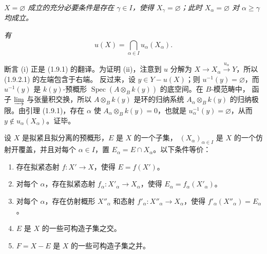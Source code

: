 \begin{env}[1.9.2.i]
\label{IV.1.9.2.i-fr}
\emph{$X=\varnothing$ 成立的充分必要条件是存在 $\gamma\in I$，使得
$X_\gamma=\varnothing$；此时 $X_\alpha=\varnothing$ 对
$\alpha\geq\gamma$ 均成立。}
\end{env}


\begin{env}[1.9.2.ii]
\label{IV.1.9.2.ii-fr}
\emph{有}
\[
  u(X)=\bigcap_{\alpha\in I}u_\alpha(X_\alpha). \tag{1.9.2.1}
  \label{IV.1.9.2.1-fr}
\]
\end{env}

断言 (i) 正是 (1.9.1) 的翻译。为证明 (ii)，注意到 $u$ 分解为
$X\to X_\alpha\xrightarrow{u_\alpha}Y$，所以 (1.9.2.1) 的左端包含于右端。
反过来，设 $y\in Y-u(X)$；则 $u^{-1}(y)=\varnothing$，而 $u^{-1}(y)$ 是
$k(y)$-预概形 $\operatorname{Spec}(A\otimes_Bk(y))$ 的底空间。在 $B$-模范畴中，
函子 $\varinjlim$ 与张量积交换，所以 $A\otimes_Bk(y)$ 是环的归纳系统
$A_\alpha\otimes_Bk(y)$ 的归纳极限。由引理 (1.9.1)，存在 $\alpha$ 使
$A_\alpha\otimes_Bk(y)=0$，也就是 $u_\alpha^{-1}(y)=\varnothing$，从而
$y\notin u_\alpha(X_\alpha)$。证毕。

\begin{proposition}[1.9.3]
\label{IV.1.9.3-fr}
设 $X$ 是拟紧且拟分离的预概形，$E$ 是 $X$ 的一个子集，
$(X_\alpha)_{\alpha\in I}$ 是 $X$ 的一个仿射开覆盖，并且对每个
$\alpha\in I$，置 $E_\alpha=E\cap X_\alpha$。以下条件等价：
\begin{enumerate}
  \item[a)] 存在拟紧态射 $f:X'\to X$，使得 $E=f(X')$。
  \item[a$'$)] 对每个 $\alpha$，存在拟紧态射
  $f_\alpha:X'_\alpha\to X_\alpha$，使得
  $E_\alpha=f_\alpha(X'_\alpha)$。
  \item[a$''$)] 对每个 $\alpha$，存在仿射概形 $X''_\alpha$ 和态射
  $f'_\alpha:X''_\alpha\to X_\alpha$，使得
  $f'_\alpha(X''_\alpha)=E_\alpha$。
  \item[b)] $E$ 是 $X$ 的一些可构造子集之交。
  \item[b$'$)] $F=X-E$ 是 $X$ 的一些可构造子集之并。
\end{enumerate}
\end{proposition}

